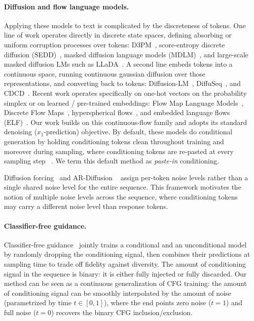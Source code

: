 \documentclass{article}
\begin{document}
\paragraph{Diffusion and flow language models.}
Applying these models to text is complicated by the discreteness of tokens. One line of work operates
directly in discrete state spaces, defining absorbing or uniform corruption processes over tokens:
D3PM~\citep{d3pm}, score-entropy discrete diffusion (SEDD)~\citep{sedd}, masked diffusion language
models (MDLM)~\citep{mdlm}, and large-scale masked diffusion LMs such as LLaDA~\citep{llada}. 
A second line embeds tokens into a continuous space, running continuous gaussian diffusion over those
representations, and converting back to tokens: Diffusion-LM~\citep{diffusion_lm}, DiffuSeq~\citep{diffuseq},
and CDCD~\citep{cdcd}. Recent work operates specifically on one-hot vectors on the probability simplex or 
on learned / pre-trained embeddings: Flow Map Language
Models~\citep{flm}, Discrete Flow Maps~\citep{discrete_flow_maps}, hyperspherical
flows~\citep{hyperspherical_flows}, and embedded language flows (ELF)~\citep{elf}. Our work builds on
this continuous-flow family and adopts its standard denoising ($x_1$-prediction) objective. By default,
these models do conditional generation by holding conditioning tokens clean throughout training
and moreover during sampling, where conditioning tokens are re-pasted at every sampling step ~\citep{flm, elf}.
We term this default method as \emph{paste-in} conditioning.

Diffusion forcing~\citep{diffusion_forcing} and AR-Diffusion ~\citep{ar_diffusion} assign per-token noise levels rather 
than a single shared noise level for the entire sequence. This framework
motivates the notion of multiple noise levels across the sequence, where conditioning tokens may
carry a different noise level than response tokens.


\paragraph{Classifier-free guidance.}
Classifier-free guidance~\citep{cfg} jointly trains a conditional and an unconditional model by
randomly dropping the conditioning signal, then combines their predictions at sampling time to trade
off fidelity against diversity. The amount of conditioning signal in the sequence is binary:
it is either fully injected or fully discarded. Our method can be seen as a continuous generalization
of CFG training: the amount of conditioning signal can be smoothly interpolated by the amount of noise 
(parametrized by time $t \in [0,1]$),
where the end points zero noise  ($t = 1$) and full noise ($t = 0$) recovers the binary CFG inclusion/exclusion.
\end{document}

